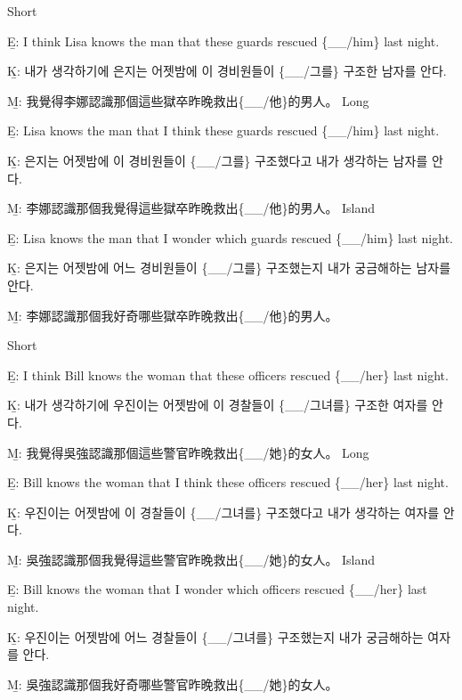 \pex %
\a Short\par\nobreak
\beginsubsub
\b{E:} I think Lisa knows the man that these guards rescued \{\_\_/him\} last night.\par\nobreak
\b{K:} \ko 내가 생각하기에 은지는 어젯밤에 이 경비원들이 \{\_\_/그를\} 구조한 남자를 안다. \normalfont\par\nobreak
\b{M:} \zh 我覺得李娜認識那個這些獄卒昨晚救出\{\_\_/他\}的男人。 \normalfont
\endsubsub
\a Long\par\nobreak
\beginsubsub
\b{E:} Lisa knows the man that I think these guards rescued \{\_\_/him\} last night.\par\nobreak
\b{K:} \ko 은지는 어젯밤에 이 경비원들이 \{\_\_/그를\} 구조했다고 내가 생각하는 남자를 안다. \normalfont\par\nobreak
\b{M:} \zh 李娜認識那個我覺得這些獄卒昨晚救出\{\_\_/他\}的男人。 \normalfont
\endsubsub
\a Island\par\nobreak
\beginsubsub
\b{E:} Lisa knows the man that I wonder which guards rescued \{\_\_/him\} last night.\par\nobreak
\b{K:} \ko 은지는 어젯밤에 어느 경비원들이 \{\_\_/그를\} 구조했는지 내가 궁금해하는 남자를 안다\normalfont.\par\nobreak
\b{M:} \zh 李娜認識那個我好奇哪些獄卒昨晚救出\{\_\_/他\}的男人。\normalfont
\endsubsub
\xe

\pex %
\a Short\par\nobreak
\beginsubsub
\b{E:} I think Bill knows the woman that these officers rescued \{\_\_/her\} last night.\par\nobreak
\b{K:} \ko 내가 생각하기에 우진이는 어젯밤에 이 경찰들이 \{\_\_/그녀를\} 구조한 여자를 안다. \normalfont\par\nobreak
\b{M:} \zh 我覺得吳強認識那個這些警官昨晚救出\{\_\_/她\}的女人。 \normalfont
\endsubsub
\a Long\par\nobreak
\beginsubsub
\b{E:} Bill knows the woman that I think these officers rescued \{\_\_/her\} last night.\par\nobreak
\b{K:} \ko 우진이는 어젯밤에 이 경찰들이 \{\_\_/그녀를\} 구조했다고 내가 생각하는 여자를 안다. \normalfont\par\nobreak
\b{M:} \zh 吳強認識那個我覺得這些警官昨晚救出\{\_\_/她\}的女人。 \normalfont
\endsubsub
\a Island\par\nobreak
\beginsubsub
\b{E:} Bill knows the woman that I wonder which officers rescued \{\_\_/her\} last night.\par\nobreak
\b{K:} \ko 우진이는 어젯밤에 어느 경찰들이 \{\_\_/그녀를\} 구조했는지 내가 궁금해하는 여자를 안다\normalfont.\par\nobreak
\b{M:} \zh 吳強認識那個我好奇哪些警官昨晚救出\{\_\_/她\}的女人。\normalfont
\endsubsub
\xe


